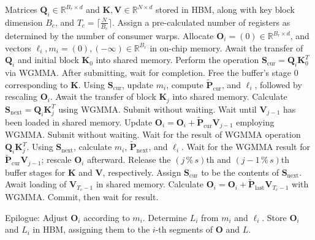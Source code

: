 \begin{algorithm}[H]
    \caption{\small\label{alg:flash3_wgmma}\textsc{FlashAttention-3} consumer warpgroup forward pass}
    \begin{algorithmic}[1]
      \REQUIRE  Matrices $\mathbf{Q}_i \in \mathbb{R}^{B_r \times d}$ and $\mathbf{K}, \mathbf{V} \in \mathbb{R}^{N \times d}$ stored in HBM, along with key block dimension $B_c$, and $T_c = \lceil \frac{N}{B_c} \rceil$.
      \STATE Assign a pre-calculated number of registers as determined by the number of consumer warps.
      \STATE Allocate $\mathbf{O}_i = (0) \in \mathbb{R}^{B_r \times d}$, and vectors $\ell_i, m_i = (0), (-\infty) \in \mathbb{R}^{B_r}$ in on-chip memory.
      \STATE Await the transfer of $\mathbf{Q}_i$ and initial block $\mathbf{K}_0$ into shared memory.
      \STATE Perform the operation $\mathbf{S}_{\mathrm{cur}} = \mathbf{Q}_i \mathbf{K}_0^T$ via WGMMA. After submitting, wait for completion.
      \STATE Free the buffer's stage $0$ corresponding to $\mathbf{K}$.
      \STATE Using $\mathbf{S}_{\mathrm{cur}}$, update $m_{i}$, compute $\tilde{\mathbf{P}}_{\mathrm{cur}}$, and $\ell_{i}$, followed by rescaling $\mathbf{O}_i$.
        \STATE Await the transfer of block $\mathbf{K}_j$ into shared memory.
        \label{code:mainloop_start}
        \STATE Calculate $\mathbf{S}_{\mathrm{next}} = \mathbf{Q}_i \mathbf{K}_{j}^T$ using WGMMA. Submit without waiting. \label{code:first_wgmma}
        \STATE Wait until $\mathbf{V}_{j-1}$ has been loaded in shared memory.
        \STATE Update $\mathbf{O}_{i} = \mathbf{O}_{i} + \tilde{\mathbf{P}}_{\mathrm{cur}} \mathbf{V}_{j-1}$ employing WGMMA. Submit without waiting. \label{code:second_wgmma}
        \STATE Wait for the result of WGMMA operation $\mathbf{Q}_i \mathbf{K}_{j}^T$.
        \STATE Using $\mathbf{S}_{\mathrm{next}}$, calculate $m_{i}$, $\tilde{\mathbf{P}}_{\mathrm{next}}$, and $\ell_{i}$. \label{code:softmax}
        \STATE Wait for the WGMMA result for $\tilde{\mathbf{P}}_{\mathrm{cur}} \mathbf{V}_{j-1}$; rescale $\mathbf{O}_i$ afterward.
        \STATE Release the $(j\,\%\,s)$th and $(j-1\,\%\,s)$th buffer stages for $\mathbf{K}$ and $\mathbf{V}$, respectively.
        \STATE Assign $\mathbf{S}_{\mathrm{cur}}$ to be the contents of $\mathbf{S}_{\mathrm{next}}$.
        \label{code:mainloop_end}
      \ENDFOR \STATE Await loading of $\mathbf{V}_{T_c - 1}$ in shared memory.
      \STATE Calculate 
      $\mathbf{O}_{i} = \mathbf{O}_{i} + \tilde{\mathbf{P}}_{\mathrm{last}} \mathbf{V}_{T_c - 1}$ with WGMMA. Commit, then wait for result.

\STATE Epilogue: Adjust $\mathbf{O}_{i}$ according to $m_{i}$. Determine $L_{i}$ from $m_{i}$ and $\ell_{i}$.  
Store $\mathbf{O}_{i}$ and $L_{i}$ in HBM, assigning them to the $i$-th segments of $\mathbf{O}$ and $L$.  
\end{algorithmic}
\end{algorithm}

